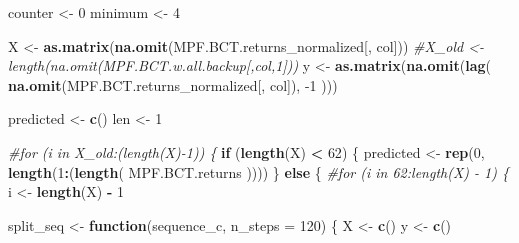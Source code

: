 \documentclass[]{article}
\newenvironment{Shaded}{\begin{snugshade}}{\end{snugshade}}
\newcommand{\CommentTok}[1]{\textcolor[rgb]{0.56,0.35,0.01}{\textit{#1}}}
\newcommand{\ControlFlowTok}[1]{\textcolor[rgb]{0.13,0.29,0.53}{\textbf{#1}}}
\newcommand{\DataTypeTok}[1]{\textcolor[rgb]{0.13,0.29,0.53}{#1}}
\newcommand{\DecValTok}[1]{\textcolor[rgb]{0.00,0.00,0.81}{#1}}
\newcommand{\KeywordTok}[1]{\textcolor[rgb]{0.13,0.29,0.53}{\textbf{#1}}}
\newcommand{\NormalTok}[1]{#1}
\newcommand{\OperatorTok}[1]{\textcolor[rgb]{0.81,0.36,0.00}{\textbf{#1}}}
\newcommand{\StringTok}[1]{\textcolor[rgb]{0.31,0.60,0.02}{#1}}
\begin{document}
\begin{Shaded}
\begin{Highlighting}[]
{{{{{\NormalTok{                 counter <-}\StringTok{ }\DecValTok{0}
\NormalTok{                 minimum <-}\StringTok{ }\DecValTok{4}
                 
                 
\NormalTok{                 X <-}\StringTok{ }\KeywordTok{as.matrix}\NormalTok{(}\KeywordTok{na.omit}\NormalTok{(MPF.BCT.returns_normalized[, col]))}
                 \CommentTok{#X_old <- length(na.omit(MPF.BCT.w.all.backup[,col,1]))}
\NormalTok{                 y <-}
\StringTok{                   }\KeywordTok{as.matrix}\NormalTok{(}\KeywordTok{na.omit}\NormalTok{(}\KeywordTok{lag}\NormalTok{(}
                     \KeywordTok{na.omit}\NormalTok{(MPF.BCT.returns_normalized[, col]), }\DecValTok{-1}
\NormalTok{                   )))}
                 
\NormalTok{                 predicted <-}\StringTok{ }\KeywordTok{c}\NormalTok{()}
\NormalTok{                 len <-}\StringTok{ }\DecValTok{1}
                 
                 \CommentTok{#for (i in X_old:(length(X)-1)) \{}
                 \ControlFlowTok{if}\NormalTok{ (}\KeywordTok{length}\NormalTok{(X) }\OperatorTok{<}\StringTok{ }\DecValTok{62}\NormalTok{) \{}
\NormalTok{                   predicted <-}\StringTok{ }\KeywordTok{rep}\NormalTok{(}\DecValTok{0}\NormalTok{, }\KeywordTok{length}\NormalTok{(}\DecValTok{1}\OperatorTok{:}\NormalTok{(}\KeywordTok{length}\NormalTok{(}
\NormalTok{                     MPF.BCT.returns}
\NormalTok{                   ))))}
\NormalTok{                 \} }\ControlFlowTok{else}\NormalTok{ \{}
                   \CommentTok{#for (i in 62:length(X) - 1) \{}
\NormalTok{                   i <-}\StringTok{ }\KeywordTok{length}\NormalTok{(X) }\OperatorTok{-}\StringTok{ }\DecValTok{1}
                   
                   
\NormalTok{                   split_seq <-}\StringTok{ }\ControlFlowTok{function}\NormalTok{(sequence_c, }\DataTypeTok{n_steps =} \DecValTok{120}\NormalTok{) \{}
\NormalTok{                     X <-}\StringTok{ }\KeywordTok{c}\NormalTok{()}
\NormalTok{                     y <-}\StringTok{ }\KeywordTok{c}\NormalTok{()}
                     
}}}}}
\end{Highlighting}
\end{Shaded}
\end{document}
